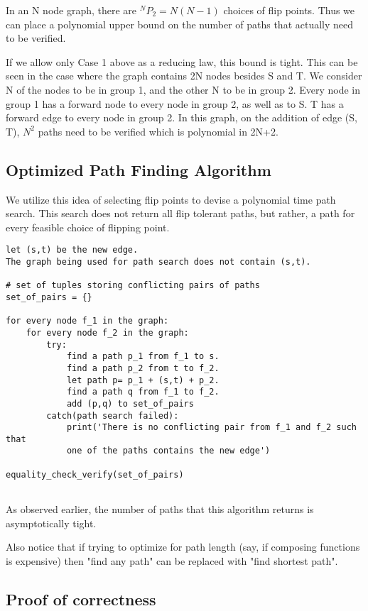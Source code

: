 \documentclass{article}
\begin{document}
In an N node graph, there are $^NP_2 = N(N-1)$ choices of flip points. Thus we can place a polynomial upper bound on the number of paths that actually need to be verified.

If we allow only Case 1 above as a reducing law, this bound is tight. 
This can be seen in the case where the graph contains 2N nodes besides S and T. We consider N of the nodes to be in group 1, and the other N to be in group 2. Every node in group 1 has a forward node to every node in group 2, as well as to S. T has a forward edge to every node in group 2. In this graph, on the addition of edge (S, T), $N^2$ paths need to be verified which is polynomial in 2N+2.

\subsection{Optimized Path Finding Algorithm}
We utilize this idea of selecting flip points to devise a polynomial time path search. This search does not return all flip tolerant paths, but rather, a path for every feasible choice of flipping point.

\begin{verbatim}
let (s,t) be the new edge.
The graph being used for path search does not contain (s,t).

# set of tuples storing conflicting pairs of paths
set_of_pairs = {}

for every node f_1 in the graph:
    for every node f_2 in the graph:
        try:
            find a path p_1 from f_1 to s.
            find a path p_2 from t to f_2.
            let path p= p_1 + (s,t) + p_2.
            find a path q from f_1 to f_2.
            add (p,q) to set_of_pairs    
        catch(path search failed):
            print('There is no conflicting pair from f_1 and f_2 such that
            one of the paths contains the new edge')

equality_check_verify(set_of_pairs)
            
\end{verbatim}

As observed earlier, the number of paths that this algorithm returns is asymptotically tight.

Also notice that if trying to optimize for path length (say, if composing functions is expensive) then "find any path" can be replaced with "find shortest path".

\subsection{Proof of correctness}
\end{document}
